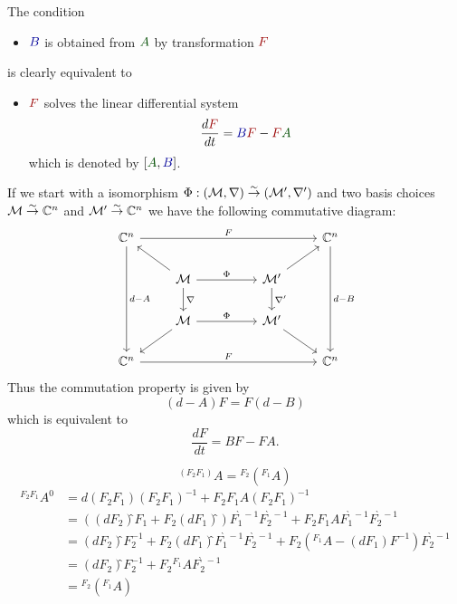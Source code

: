 \begin{rem}
  \def\myB{\textcolor{blue!60!black}{B}}
  \def\myA{\textcolor{green!30!black}{A}}
  \def\myF{\textcolor{red!60!black}{F}}
  The condition
  \begin{itemize}
    \item[] $\myB$ is obtained from $\myA$ by transformation $\myF$
  \end{itemize}
  is clearly equivalent to
  \begin{itemize}
    \item[]  $\myF$ solves the linear differential system
      \[
        \frac{d\myF}{dt}=\myB\myF-\myF\myA
      \]
      which is denoted by $[\myA,\myB]$.
  \end{itemize}
  \begin{s-rem}
    If we start with a isomorphism
    $\Phi:(\mathcal{M},\nabla)\overset{\sim}\to(\mathcal{M}',\nabla')$ and two basis choices
    $\mathcal{M}\overset{\sim}\to\mathbb{C}^n$ and $\mathcal{M}'\overset{\sim}\to\mathbb{C}^n$ we have the
    following commutative diagram:
    \[ \begin{tikzcd}
        \C^n \arrow{rrrr}{F}\arrow{ddd}{d-A}&&&& \C^n\arrow{ddd}{d-B}
        \\ & \cM \dar{\nabla}\arrow{rr}{\Phi}\ular&& \cM'\dar{\nabla'}\urar
        \\ & \cM \arrow{rr}{\Phi}\dlar&& \cM'\drar
        \\ \C^n \arrow{rrrr}{F}&&&& \C^n
    \end{tikzcd} \]
    Thus the commutation property is given by
    \[
      (d-A)F=F(d-B)
    \]
    which is equivalent \TODO[really] to
      \[
        \frac{dF}{dt}=BF-FA.
      \]
  \end{s-rem}
  \begin{comment}
    \begin{s-rem}
      $[A]=[0,A]$ \TODO[korrekt?]
    \end{s-rem}
  \end{comment}
\end{rem}
\begin{rem}
  \[
    {}^{(F_2F_1)}\!A =
    {}^{F_2}\!\left({}^{F_1}\!A\right)
  \]
  \begin{align*}
    {}^{F_2F_1}\!A^0
    &= d(F_2F_1)(F_2F_1)^{-1}+F_2F_1 A(F_2F_1)^{-1}
  \\&=\left(
      \left(dF_2\right)̂F_1
      +F_2\left(dF_1\right)̂
    \right) F_1^{̀-1} F_2^{̀-1}
    +F_2F_1 A F_1^{̀-1}F_2^{̀-1}
  \\&= \left(dF_2\right)̂F_2^{-1}
     +F_2\left(dF_1\right)̂ F_1^{̀-1} F_2^{̀-1}
     +F_2
     \left(
       {}^{F_1}\!A-\left(dF_1\right)F^{-1}
     \right)
     F_2^{̀-1}
  \\&= \left(dF_2\right)̂F_2^{-1} +F_2 {}^{F_1}\!A F_2^{̀-1}
  \\&= {}^{F_2}\!\left({}^{F_1}\!A\right)
  \end{align*}
\end{rem}
